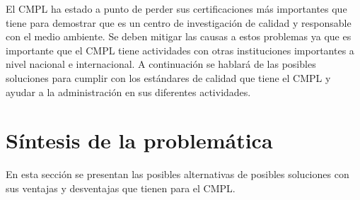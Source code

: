 El CMPL ha estado a punto de perder sus certificaciones más importantes que tiene para demostrar que es un centro de investigación de calidad y responsable con el medio ambiente. Se deben mitigar las causas a estos problemas ya que es importante que el CMPL tiene actividades con otras instituciones importantes a nivel nacional e internacional. A continuación se hablará de las posibles soluciones para cumplir con los estándares de calidad que tiene el CMPL y ayudar a la administración en sus diferentes actividades. 

\section{Síntesis de la problemática}

En esta sección se presentan las posibles alternativas de posibles soluciones con sus ventajas y desventajas que tienen para el CMPL.




